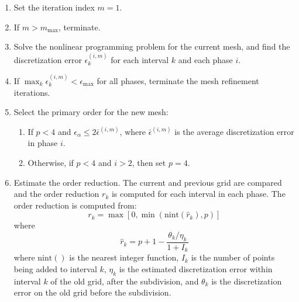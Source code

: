 \documentclass[a4paper,11pt]{report}    %
\begin{document}
\begin{enumerate}
 \item Set the iteration index $m=1$. 
 \item If $m>m_{\max}$, terminate.

 \item Solve the nonlinear programming problem for the current mesh, and find the discretization error
$\epsilon_k^{(i,m)}$ for each interval $k$ and each phase $i$. 

 \item If $\max_k \epsilon_k^{(i,m)} < \epsilon_{\max}$ for all phases, terminate the mesh refinement iterations.

\item Select the primary order for the new mesh:
 \begin{enumerate} \item If $p<4$ and $\epsilon_{\alpha} \le 2 \bar \epsilon^{(i,m)}$, where $\bar \epsilon^{(i,m)}$ is the average discretization error in phase $i$.
                   \item Otherwise, if $p<4$ and $i>2$, then set $p=4$.
 \end{enumerate}

\item Estimate the order reduction. The current and previous grid are compared and the order reduction $r_k$ is computed for each interval
in each phase. The order reduction is computed from: 
\[
  r_k = \max [0, \min(\mathrm{nint}(\hat r_k), p ) ]
\]
where
\[
   \hat r_k = p+1 - \frac{\theta_k/\eta_k }{1+I_k}
\]
where $\mathrm{nint}()$ is the nearest integer function,  $I_k$ is the number of points being added to interval $k$, $\eta_k$ is the estimated discretization error within interval $k$ of the old grid, after
the subdivision, and $\theta_k$ is the discretization error on the old grid before the subdivision.


\end{enumerate}
\end{document}

